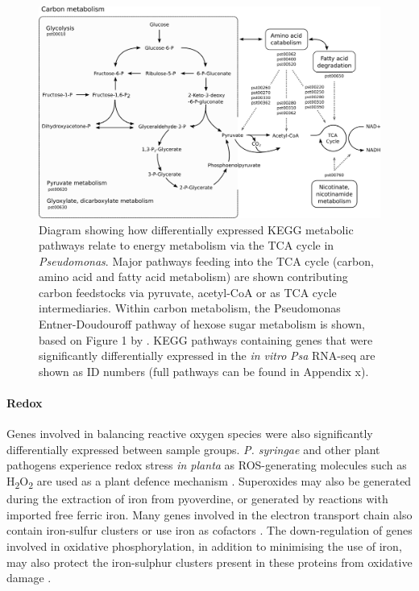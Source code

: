 \begin{figure}[H]
    \centering
    \includegraphics{psa/entner-doudouroff.png}
    \caption[Diagram showing differentially expressed metabolic pathways feeding into energy metabolism in \textit{Psa}]{Diagram showing how differentially expressed KEGG metabolic pathways relate to energy metabolism via the TCA cycle in \textit{Pseudomonas}. Major pathways feeding into the TCA cycle (carbon, amino acid and fatty acid metabolism) are shown contributing carbon feedstocks via pyruvate, acetyl-CoA or as TCA cycle intermediaries. Within carbon metabolism, the Pseudomonas Entner-Doudouroff pathway of hexose sugar metabolism is shown, based on Figure 1 by \cite{Morris1727}. KEGG pathways containing genes that were significantly differentially expressed in the \textit{in vitro} \textit{Psa} RNA-seq are shown as ID numbers (full pathways can be found in Appendix x). }
    \label{fig:entner_doudouroff}
\end{figure}
\paragraph{Redox}

Genes involved in balancing reactive oxygen species were also significantly differentially expressed between sample groups. \textit{P. syringae} and other plant pathogens experience redox stress \textit{in planta} as ROS-generating molecules such as H\textsubscript{2}O\textsubscript{2} are used as a plant defence mechanism \citep{Jones_Lindow_Wildermuth_2007}. Superoxides may also be generated during the extraction of iron from pyoverdine, or generated by reactions with imported free ferric iron. Many genes involved in the electron transport chain also contain iron-sulfur clusters or use iron as cofactors  \citep{Tuanyok_Kim_Nierman_Yu_Dunbar_Moore_Baker_Tom_Ling_Woods_2005}. The down-regulation of genes involved in oxidative phosphorylation, in addition to minimising the use of iron, may also protect the iron-sulphur clusters present in these proteins from oxidative damage \citep{Kawakami_Kuroki_Ishii_Igarashi_Arai_2010}.

